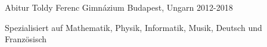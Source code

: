 

\begin{cventries}

  \cventry
    {Abitur} %
    {Toldy Ferenc Gimnázium} %
    {Budapest, Ungarn} %
    {2012-2018} %
    {
      \begin{cvitems} %
        \item {Spezialisiert auf Mathematik, Physik, Informatik, Musik, Deutsch und Französisch}
      \end{cvitems}
    }

\end{cventries}
